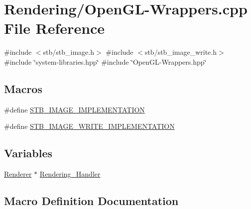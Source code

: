 \hypertarget{OpenGL-Wrappers_8cpp}{}\section{Rendering/\+Open\+G\+L-\/\+Wrappers.cpp File Reference}
\label{OpenGL-Wrappers_8cpp}
{\ttfamily \#include $<$stb/stb\+\_\+image.\+h$>$}\newline
{\ttfamily \#include $<$stb/stb\+\_\+image\+\_\+write.\+h$>$}\newline
{\ttfamily \#include \char`\"{}system-\/libraries.\+hpp\char`\"{}}\newline
{\ttfamily \#include \char`\"{}Open\+G\+L-\/\+Wrappers.\+hpp\char`\"{}}\newline
\subsection*{Macros}
\begin{DoxyCompactItemize}
\item 
\#define \mbox{\hyperlink{OpenGL-Wrappers_8cpp_a18372412ad2fc3ce1e3240b3cf0efe78}{S\+T\+B\+\_\+\+I\+M\+A\+G\+E\+\_\+\+I\+M\+P\+L\+E\+M\+E\+N\+T\+A\+T\+I\+ON}}
\item 
\#define \mbox{\hyperlink{OpenGL-Wrappers_8cpp_aefe397a94e8feddc652f92ef40ce9597}{S\+T\+B\+\_\+\+I\+M\+A\+G\+E\+\_\+\+W\+R\+I\+T\+E\+\_\+\+I\+M\+P\+L\+E\+M\+E\+N\+T\+A\+T\+I\+ON}}
\end{DoxyCompactItemize}
\subsection*{Variables}
\begin{DoxyCompactItemize}
\item 
\mbox{\hyperlink{classRenderer}{Renderer}} $\ast$ \mbox{\hyperlink{OpenGL-Wrappers_8cpp_a21679bfe3ff6515d046879b080ac8ca9}{Rendering\+\_\+\+Handler}}
\end{DoxyCompactItemize}


\subsection{Macro Definition Documentation}
\mbox{\label{OpenGL-Wrappers_8cpp_a18372412ad2fc3ce1e3240b3cf0efe78}} 
